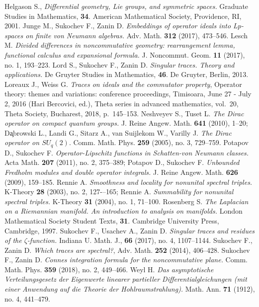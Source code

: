 \documentclass[12pt]{article}
\begin{document}
\begin{thebibliography}{99}
 Helgason S., {\it Differential geometry, Lie groups, and symmetric spaces.} Graduate Studies in Mathematics, {\bf 34}. American Mathematical Society, Providence, RI, 2001.
 Junge M., Sukochev F., Zanin D. {\it Embeddings of operator ideals into Lp-spaces on finite von Neumann algebras.} Adv. Math. {\bf 312} (2017), 473--546.
 Lesch M. {\it Divided differences in noncommutative geometry: rearrangement lemma, functional calculus and expansional formula.} J. Noncommut. Geom. {\bf 11} (2017), no. 1, 193--223.
 Lord S., Sukochev F., Zanin D. {\it Singular traces. Theory and applications.} De Gruyter Studies in Mathematics, {\bf 46}. De Gruyter, Berlin, 2013.
 Loreaux J., Weiss G. {\it Traces on ideals and the commutator property}, Operator theory: themes and variations: conference proceedings, Timisoara, June 27 - July 2, 2016 (Hari Bercovici, ed.), Theta series in advanced mathematics, vol.~20, Theta Society, Bucharest, 2018, p.~145--153.
 Neshveyev S., Tuset L. {\it The Dirac operator on compact quantum groups.} J. Reine Angew. Math. {\bf 641} (2010), 1--20; Da̧browski L., Landi G., Sitarz A., van Suijlekom W., Varilly J. {\it The Dirac operator on $SU_q(2).$} Comm. Math. Phys. {\bf 259} (2005), no. 3, 729--759.
 Potapov D., Sukochev F. {\it Operator-Lipschitz functions in Schatten-von Neumann classes.} Acta Math. {\bf 207} (2011), no. 2, 375--389; Potapov D., Sukochev F. {\it Unbounded Fredholm modules and double operator integrals.} J. Reine Angew. Math. {\bf 626} (2009), 159--185.
 Rennie A. {\it Smoothness and locality for nonunital spectral triples.} K-Theory {\bf 28} (2003), no. 2, 127-–165; Rennie A. {\it Summability for nonunital spectral triples. } K-Theory {\bf 31} (2004), no. 1, 71--100.
 Rosenberg S. {\it The Laplacian on a Riemannian manifold. An introduction to analysis on manifolds.} London Mathematical Society Student Texts, {\bf 31}. Cambridge University Press, Cambridge, 1997.
 Sukochev F., Usachev A., Zanin D. {\it Singular traces and residues of the $\zeta$-function.} Indiana U. Math. J., {\bf 66} (2017), no. 4, 1107--1144.
Sukochev F., Zanin D. \emph{Which traces are spectral?}, Adv. Math. \textbf{252} (2014), 406--428.
 Sukochev F., Zanin D. {\it Connes integration formula for the noncommutative plane.} Comm. Math. Phys. {\bf 359} (2018), no. 2, 449--466.
 Weyl H. {\it Das asymptotische Verteilungsgesetz der Eigenwerte linearer partieller Differentialgleichungen (mit einer Anwendung auf die Theorie der Hohlraumstrahlung).} Math. Ann. {\bf 71} (1912), no. 4, 441--479. 
\end{thebibliography}
\end{document}
